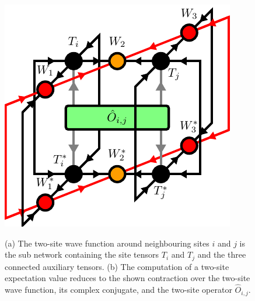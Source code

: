 \begin{figure}
	\centering
	\subcaptionbox{\label{fig:disoTPS_twosite_expectation_value_environment}}
	{%
		\usebox{\largestimage}
	}
	\quad\quad
	\subcaptionbox{\label{fig:disoTPS_twosite_expectation_value_computation}}
	{%
		\raisebox{\dimexpr.5\ht\largestimage-.5\height}
		{%
			\includegraphics[scale=1.0]{figures/tikz/disoTPS/two_site_expectation_value/two_site_expectation_value_b.pdf}
		}
	}
	\caption{(a) The two-site wave function around neighbouring sites $i$ and $j$ is the sub network containing the site tensors $T_i$ and $T_j$ and the three connected auxiliary tensors. (b) The computation of a two-site expectation value reduces to the shown contraction over the two-site wave function, its complex conjugate, and the two-site operator $\hat{O}_{i,j}$.}
	\label{fig:disoTPS_twosite_expectation_value}
\end{figure}
